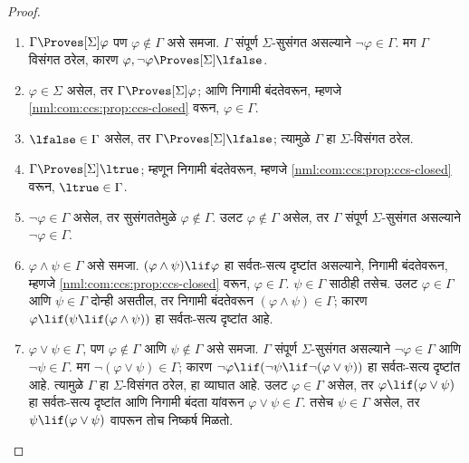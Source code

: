 \begin{proof}
  \begin{enumerate}
  \item $\Gamma \Proves[\Sigma] \varphi$ पण $\varphi \notin
    \Gamma$ असे समजा. $\Gamma$ संपूर्ण
    $\Sigma$-सुसंगत असल्याने
    $\lnot\varphi \in \Gamma$. मग $\Gamma$ विसंगत
    ठरेल, कारण $\varphi, \lnot \varphi \Proves[\Sigma] \lfalse$.

  \item $\varphi \in \Sigma$ असेल, तर
    $\Gamma \Proves[\Sigma] \varphi$; आणि
    निगामी बंदतेवरून, म्हणजे
    \ref{nml:com:ccs:prop:ccs-closed} वरून, $\varphi
    \in \Gamma$.

  \item $\lfalse \in \Gamma$ असेल,
    तर $\Gamma \Proves[\Sigma] \lfalse$;
    त्यामुळे $\Gamma$ हा $\Sigma$-विसंगत
    ठरेल.

  \item $\Gamma \Proves[\Sigma] \ltrue$;
    म्हणून निगामी बंदतेवरून, म्हणजे
    \ref{nml:com:ccs:prop:ccs-closed} वरून,
    $\ltrue \in \Gamma$.

\item $\lnot\varphi \in \Gamma$ असेल, तर
    सुसंगततेमुळे $\varphi \notin \Gamma$.
    उलट $\varphi \notin \Gamma$ असेल, तर
    $\Gamma$ संपूर्ण $\Sigma$-सुसंगत
    असल्याने $\lnot\varphi \in \Gamma$.

  \item $\varphi \land \psi \in
      \Gamma$ असे समजा. $(\varphi \land \psi) \lif \varphi$
      हा सर्वतः-सत्य दृष्टांत असल्याने,
      निगामी बंदतेवरून, म्हणजे
      \ref{nml:com:ccs:prop:ccs-closed} वरून, $\varphi \in \Gamma$.
      $\psi \in \Gamma$ साठीही तसेच. उलट
      $\varphi \in \Gamma$ आणि $\psi \in
      \Gamma$ दोन्ही असतील, तर निगामी
      बंदतेवरून $(\varphi \land \psi) \in
      \Gamma$; कारण $\varphi \lif (\psi \lif (\varphi \land \psi))$
      हा सर्वतः-सत्य दृष्टांत आहे.

  \item $\varphi \lor \psi \in
      \Gamma$, पण $\varphi \notin \Gamma$ आणि
      $\psi \notin \Gamma$ असे समजा. $\Gamma$
      संपूर्ण $\Sigma$-सुसंगत असल्याने
      $\lnot\varphi \in \Gamma$ आणि
      $\lnot \psi \in \Gamma$. मग
      $\lnot(\varphi \lor \psi) \in \Gamma$;
      कारण $\lnot \varphi \lif (\lnot \psi \lif \lnot (\varphi \lor \psi))$
      हा सर्वतः-सत्य दृष्टांत आहे. त्यामुळे
      $\Gamma$ हा $\Sigma$-विसंगत ठरेल,
      हा व्याघात आहे. उलट $\varphi \in \Gamma$ असेल,
      तर $\varphi \lif (\varphi \lor \psi)$ हा सर्वतः-सत्य दृष्टांत
      आणि निगामी बंदता यांवरून $\varphi \lor \psi \in \Gamma$.
      तसेच $\psi \in \Gamma$ असेल, तर
      $\psi \lif (\varphi \lor \psi)$ वापरून तोच निष्कर्ष मिळतो.


\end{enumerate}
\end{proof}
